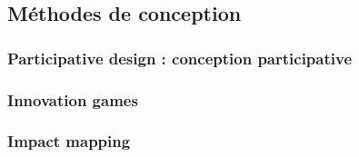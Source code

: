 	\subsection{Méthodes de conception}
		\subsubsection{Participative design : conception participative}
		
		\subsubsection{Innovation games}
		
		\subsubsection{Impact mapping}